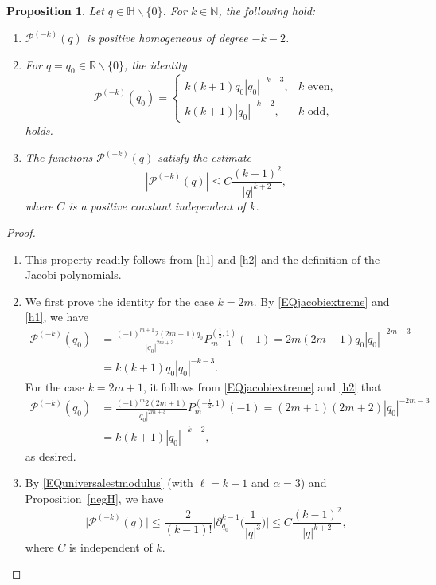 \documentclass[reqno,11pt]{amsart}
\newtheorem{proposition}[theorem]{Proposition}
\theoremstyle{definition}
\begin{document}
\begin{proposition}
Let $q \in \mathbb{H} \backslash \{0\}$. For $k \in \mathbb{N}$, the following hold:
\begin{enumerate}[label=\textnormal{(\roman{*})}]
\item $\mathcal{P}^{(-k)}(q)$ is positive homogeneous of degree $-k-2$.
\item For $q=q_0\in \mathbb{R}\backslash \{0\}$, the identity
\begin{equation*}
 \mathcal{P}^{(-k)}(q_0)=\begin{cases}
 	k(k+1)q_0|q_0|^{-k-3}, &k\text{ even},\\
 	k(k+1)|q_0|^{-k-2},&k\text{ odd},
 \end{cases}
\end{equation*}
holds.
\item The functions $ \mathcal{P}^{(-k)}(q)$ satisfy the estimate
\begin{equation}
\label{hineq}
|\mathcal{P}^{(-k)}(q)| \leq C \frac{(k-1)^2}{|q|^{k+2}},
\end{equation}
where $C$ is a positive constant independent of $k$.
\end{enumerate}
\end{proposition}
\begin{proof}
\begin{enumerate}[wide,label=\textnormal{(\roman{*})}]
	\item This property readily follows from \eqref{h1} and \eqref{h2} and the definition of the Jacobi polynomials.
	\item We first prove the identity for the case $k=2m$. By \eqref{EQjacobiextreme}  and \eqref{h1}, we have
	\begin{align*}
		\mathcal{P}^{(-k)}(q_0)&= \frac{(-1)^{m+1}2(2m+1)q_0}{|q_0|^{2m+3}}P_{m-1}^{\left(\frac{1}{2},1\right)}(-1) = 2 m(2m+1) q_0|q_0|^{-2m-3} \\
		&= k(k+1)q_0|q_0|^{-k-3}.
	\end{align*}
	For the case $k=2m+1$, it follows from \eqref{EQjacobiextreme} and \eqref{h2} that
	\begin{align*}
		\mathcal{P}^{(-k)}(q_0)&= \frac{(-1)^{m}2(2m+1)}{|q_0|^{2m+3}}P_{m}^{\left(-\frac{1}{2},1\right)}(-1) =  (2m+1)(2m+2) |q_0|^{-2m-3}\\
		& = k(k+1)|q_0|^{-k-2},
	\end{align*}
as desired.


	\item By \eqref{EQuniversalestmodulus} (with $\ell=k-1$ and $\alpha=3$) and Proposition~\ref{negH}, we have
	\[
	\big| \mathcal{P}^{(-k)}(q)\big| \leq \frac{2}{(k-1)!} \bigg|\partial_{q_0}^{k-1} \bigg( \frac{1}{|q|^3}\bigg) \bigg| \leq C \frac{(k-1)^2}{|q|^{k+2}},
	\]
	where $C$ is independent of $k$.\qedhere
\end{enumerate}
\end{proof}
\end{document}
